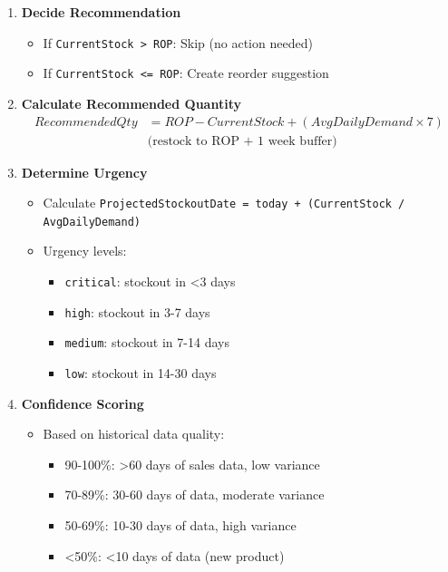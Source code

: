 \begin{enumerate}[leftmargin=*]
    \item \textbf{Decide Recommendation}
    \begin{itemize}
        \item If \texttt{CurrentStock > ROP}: Skip (no action needed)
        \item If \texttt{CurrentStock <= ROP}: Create reorder suggestion
    \end{itemize}
    
    \item \textbf{Calculate Recommended Quantity}
    \begin{align*}
        RecommendedQty &= ROP - CurrentStock + (AvgDailyDemand \times 7) \\
        &\text{(restock to ROP + 1 week buffer)}
    \end{align*}
    
    \item \textbf{Determine Urgency}
    \begin{itemize}
        \item Calculate \texttt{ProjectedStockoutDate = today + (CurrentStock / AvgDailyDemand)}
        \item Urgency levels:
        \begin{itemize}
            \item \texttt{critical}: stockout in <3 days
            \item \texttt{high}: stockout in 3-7 days
            \item \texttt{medium}: stockout in 7-14 days
            \item \texttt{low}: stockout in 14-30 days
        \end{itemize}
    \end{itemize}
    
    \item \textbf{Confidence Scoring}
    \begin{itemize}
        \item Based on historical data quality:
        \begin{itemize}
            \item 90-100\%: >60 days of sales data, low variance
            \item 70-89\%: 30-60 days of data, moderate variance
            \item 50-69\%: 10-30 days of data, high variance
            \item <50\%: <10 days of data (new product)
        \end{itemize}
    \end{itemize}
    

\end{enumerate}
